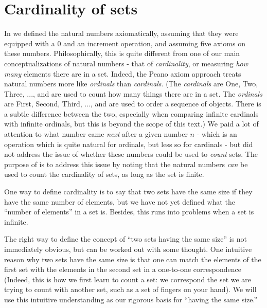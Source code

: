 \section{Cardinality of sets}\label{i:sec:3.6}

\begin{note}
  In  we defined the natural numbers axiomatically, assuming that they were equipped with a \(0\) and an increment operation, and assuming five axioms on these numbers.
  Philosophically, this is quite different from one of our main conceptualizations of natural numbers
  - that of \emph{cardinality}, or measuring \emph{how many} elements there are in a set.
  Indeed, the Peano axiom approach treats natural numbers more like \emph{ordinals} than \emph{cardinals}.
  (The \emph{cardinals} are One, Two, Three, ..., and are used to count how many things there are in a set.
  The \emph{ordinals} are First, Second, Third, ..., and are used to order a sequence of objects.
  There is a subtle difference between the two, especially when comparing infinite cardinals with infinite ordinals, but this is beyond the scope of this text.)
  We paid a lot of attention to what number came \emph{next} after a given number \(n\)
  - which is an operation which is quite natural for ordinals, but less so for cardinals
  - but did not address the issue of whether these numbers could be used to \emph{count} sets.
  The purpose of  is to address this issue by noting that the natural numbers \emph{can} be used to count the cardinality of sets, as long as the set is finite.

  One way to define cardinality is to say that two sets have the same size if they have the same number of elements, but we have not yet defined what the ``number of elements'' in a set is.
  Besides, this runs into problems when a set is infinite.

  The right way to define the concept of ``two sets having the same size'' is not immediately obvious, but can be worked out with some thought.
  One intuitive reason why two sets have the same size is that one can match the elements of the first set with the elements in the second set in a one-to-one correspondence
  (Indeed, this is how we first learn to count a set:
  we correspond the set we are trying to count with another set, such as a set of fingers on your hand).
  We will use this intuitive understanding as our rigorous basis for ``having the same size.''
\end{note}

